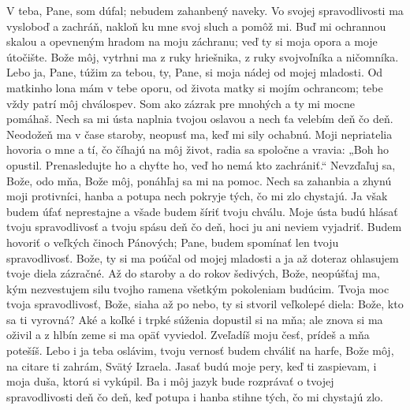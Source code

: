 V teba, Pane, som dúfal;
nebudem zahanbený naveky.
Vo svojej spravodlivosti ma vysloboď a zachráň,
\versseparator
nakloň ku mne svoj sluch a pomôž mi.
\versseparator
Buď mi ochrannou skalou
a opevneným hradom na moju záchranu;
\versseparator
veď ty si moja opora a moje útočište.
\versseparator
Bože môj, vytrhni ma z ruky hriešnika,
z ruky svojvoľníka a ničomníka.
\versseparator
Lebo ja, Pane, túžim za tebou,
ty, Pane, si moja nádej od mojej mladosti.
\versseparator
Od matkinho lona mám v tebe oporu,
od života matky si mojím ochrancom;
\versseparator
tebe vždy patrí môj chválospev.
Som ako zázrak pre mnohých
a ty mi mocne pomáhaš.
\versseparator
Nech sa mi ústa naplnia tvojou oslavou
a nech ťa velebím deň čo deň.
\versseparator
Neodožeň ma v čase staroby,
neopusť ma, keď mi sily ochabnú.
\versseparator
Moji nepriatelia hovoria o mne
a tí, čo číhajú na môj život,
radia sa spoločne
\versseparator
a vravia: „Boh ho opustil.
Prenasledujte ho a chyťte ho,
veď ho nemá kto zachrániť.“
\versseparator
Nevzďaľuj sa, Bože, odo mňa,
Bože môj, ponáhľaj sa mi na pomoc.
\versseparator
Nech sa zahanbia a zhynú moji protivníci,
hanba a potupa nech pokryje tých, čo mi zlo chystajú.
\versseparator
Ja však budem úfať neprestajne
a všade budem šíriť tvoju chválu.
\versseparator
Moje ústa budú hlásať tvoju spravodlivosť
a tvoju spásu deň čo deň,
\versseparator
hoci ju ani neviem vyjadriť.
Budem hovoriť o veľkých činoch Pánových;
Pane, budem spomínať len tvoju spravodlivosť.
\versseparator
Bože, ty si ma poúčal od mojej mladosti
a ja až doteraz ohlasujem tvoje diela zázračné.
\versseparator
Až do staroby a do rokov šedivých,
Bože, neopúšťaj ma,
\versseparator
kým nezvestujem silu tvojho ramena
všetkým pokoleniam budúcim.
\versseparator
Tvoja moc tvoja spravodlivosť, Bože,
siaha až po nebo, ty si stvoril veľkolepé diela:
Bože, kto sa ti vyrovná?
\versseparator
Aké a koľké i trpké súženia dopustil si na mňa;
ale znova si ma oživil
a z hlbín zeme si ma opäť vyviedol.
\versseparator
Zveľadíš moju česť,
prídeš a mňa potešíš.
\versseparator
Lebo i ja teba oslávim,
tvoju vernosť budem chváliť na harfe, Bože môj,
na citare ti zahrám, Svätý Izraela.
\versseparator
Jasať budú moje pery, keď ti zaspievam,
i moja duša, ktorú si vykúpil.
\versseparator
Ba i môj jazyk bude rozprávať o tvojej spravodlivosti deň čo deň,
keď potupa i hanba stihne tých, čo mi chystajú zlo.